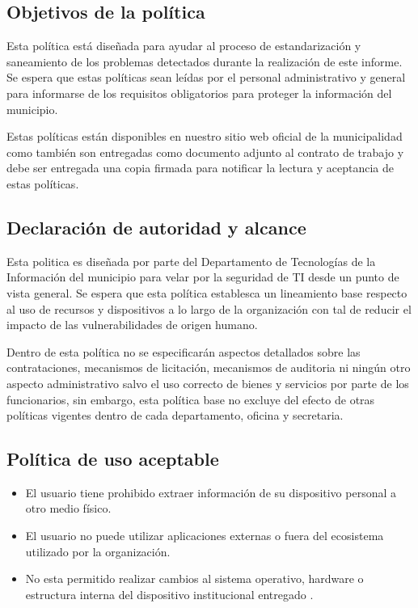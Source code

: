 % 
% 
% 
% 
% 


% 

\subsection{Objetivos de la política}
Esta política está diseñada para ayudar al proceso de estandarización y saneamiento de los problemas detectados durante la realización de este informe. Se espera que estas políticas sean leídas por el personal administrativo y general para informarse de los requisitos obligatorios para proteger la información del municipio.

Estas políticas están disponibles en nuestro sitio web oficial de la municipalidad como también son entregadas como documento adjunto al contrato de trabajo y debe ser entregada una copia firmada para notificar la lectura y aceptancia de estas políticas.

\subsection{Declaración de autoridad y alcance}
Esta politica es diseñada por parte del Departamento de Tecnologías de la Información del municipio para velar por la seguridad de TI desde un punto de vista general. Se espera que esta política establesca un lineamiento base respecto al uso de recursos y dispositivos a lo largo de la organización con tal de reducir el impacto de las vulnerabilidades de origen humano.

Dentro de esta política no se especificarán aspectos detallados sobre las contrataciones, mecanismos de licitación, mecanismos de auditoria ni ningún otro aspecto administrativo salvo el uso correcto de bienes y servicios por parte de los funcionarios, sin embargo, esta política base no excluye del efecto de otras políticas vigentes dentro de cada departamento, oficina y secretaria.

\subsection{Política de uso aceptable}
\begin{itemize}
    \item El usuario tiene prohibido extraer información de su dispositivo personal a otro medio físico.
    \item El usuario no puede utilizar aplicaciones externas o fuera del ecosistema utilizado por la organización.
    \item No esta permitido realizar cambios al sistema operativo, hardware o estructura interna del dispositivo institucional entregado .
\end{itemize}


